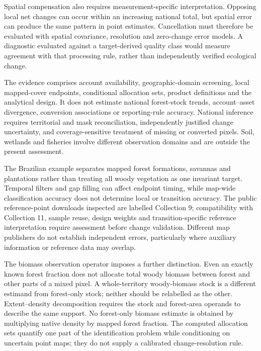 \documentclass[11pt,a4paper]{article}
\begin{document}
Spatial compensation also requires measurement-specific interpretation. Opposing local net changes can occur within an increasing national total, but spatial error can produce the same pattern in point estimates. Cancellation must therefore be evaluated with spatial covariance, resolution and zero-change error models. A diagnostic evaluated against a target-derived quality class would measure agreement with that processing rule, rather than independently verified ecological change.

The evidence comprises account availability, geographic-domain screening, local mapped-cover endpoints, conditional allocation sets, product definitions and the analytical design. It does not estimate national forest-stock trends, account--asset divergence, conversion associations or reporting-rule accuracy. National inference requires territorial and mask reconciliation, independently justified change uncertainty, and coverage-sensitive treatment of missing or converted pixels. Soil, wetlands and fisheries involve different observation domains and are outside the present assessment.

The Brazilian example separates mapped forest formations, savannas and plantations rather than treating all woody vegetation as one invariant target. Temporal filters and gap filling can affect endpoint timing, while map-wide classification accuracy does not determine local or transition accuracy. The public reference-point downloads inspected are labelled Collection 9; compatibility with Collection 11, sample reuse, design weights and transition-specific reference interpretation require assessment before change validation. Different map publishers do not establish independent errors, particularly where auxiliary information or reference data may overlap.

The biomass observation operator imposes a further distinction. Even an exactly known forest fraction does not allocate total woody biomass between forest and other parts of a mixed pixel. A whole-territory woody-biomass stock is a different estimand from forest-only stock; neither should be relabelled as the other. Extent--density decomposition requires the stock and forest-area operands to describe the same support. No forest-only biomass estimate is obtained by multiplying native density by mapped forest fraction. The computed allocation sets quantify one part of the identification problem while conditioning on uncertain point maps; they do not supply a calibrated change-resolution rule.
\end{document}
